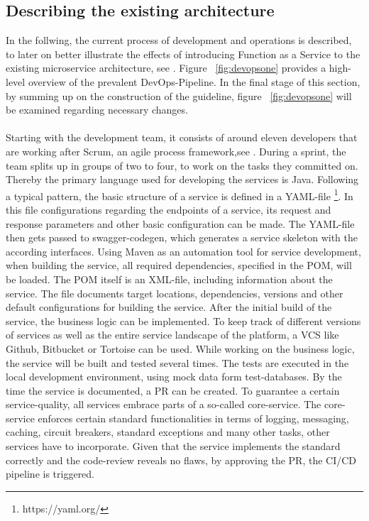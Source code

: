 \documentclass[a4paper,twoside,11pt, pagesize]{scrartcl}
\begin{document}
\begin{spacing}{1.2}
\subsection{Describing the existing architecture}
In the follwing, the current process of development and operations is described, to later on better illustrate the effects of introducing Function as a Service to the existing microservice architecture, see \cite{newman2015building}. Figure ~\ref{fig:devopsone} provides a high-level overview of the prevalent DevOps-Pipeline. In the final stage of this section, by summing up on the construction of the guideline, figure ~\ref{fig:devopsone} will be examined regarding necessary changes.\\\\ Starting with the development team, it consists of around eleven developers that are working after Scrum, an agile process framework,see \cite{pichler2013scrum}. During a sprint, the team splits up in groups of two to four, to work on the tasks they committed on. Thereby the primary language used for developing the services is Java. Following a typical pattern, the basic structure of a service is defined in a YAML-file \footnote{https://yaml.org/}. In this file configurations regarding the endpoints of a service, its request and response parameters and other basic configuration can be made. The YAML-file then gets passed to swagger-codegen, which generates a service skeleton with the according interfaces. Using Maven as an automation tool for service development, when building the service, all required dependencies, specified in the POM, will be loaded. The POM itself is an XML-file, including information about the service. The file documents target locations, dependencies, versions and other default configurations for building the service. After the initial build of the service, the business logic can be implemented. To keep track of different versions of services as well as the entire service landscape of the platform, a VCS like Github, Bitbucket or Tortoise can be used. While working on the business logic, the service will be built and tested several times. The tests are executed in the local development environment, using mock data form test-databases. By the time the service is documented, a PR can be created. To guarantee a certain service-quality, all services embrace parts of a so-called core-service. The core-service enforces certain standard functionalities in terms of logging, messaging, caching, circuit breakers, standard exceptions and many other tasks, other services have to incorporate. Given that the service implements the standard correctly and the code-review reveals no flaws, by approving the PR, the CI/CD pipeline is triggered.    

\end{spacing}
\end{document}
